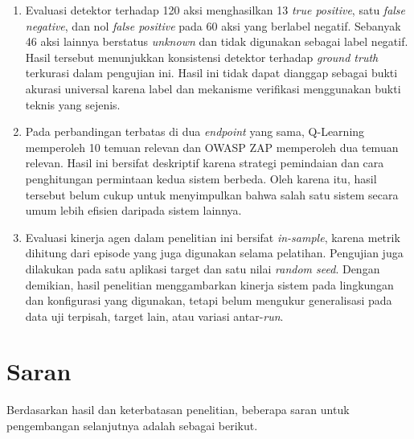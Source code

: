 \begin{enumerate}
    \item Evaluasi detektor terhadap 120 aksi menghasilkan 13 \textit{true positive}, satu \textit{false negative}, dan nol \textit{false positive} pada 60 aksi yang berlabel negatif. Sebanyak 46 aksi lainnya berstatus \textit{unknown} dan tidak digunakan sebagai label negatif. Hasil tersebut menunjukkan konsistensi detektor terhadap \textit{ground truth} terkurasi dalam pengujian ini. Hasil ini tidak dapat dianggap sebagai bukti akurasi universal karena label dan mekanisme verifikasi menggunakan bukti teknis yang sejenis.

    \item Pada perbandingan terbatas di dua \textit{endpoint} yang sama, Q-Learning memperoleh 10 temuan relevan dan OWASP ZAP memperoleh dua temuan relevan. Hasil ini bersifat deskriptif karena strategi pemindaian dan cara penghitungan permintaan kedua sistem berbeda. Oleh karena itu, hasil tersebut belum cukup untuk menyimpulkan bahwa salah satu sistem secara umum lebih efisien daripada sistem lainnya.

    \item Evaluasi kinerja agen dalam penelitian ini bersifat \textit{in-sample}, karena metrik dihitung dari episode yang juga digunakan selama pelatihan. Pengujian juga dilakukan pada satu aplikasi target dan satu nilai \textit{random seed}. Dengan demikian, hasil penelitian menggambarkan kinerja sistem pada lingkungan dan konfigurasi yang digunakan, tetapi belum mengukur generalisasi pada data uji terpisah, target lain, atau variasi antar-\textit{run}.
\end{enumerate}

\section{Saran}

Berdasarkan hasil dan keterbatasan penelitian, beberapa saran untuk pengembangan selanjutnya adalah sebagai berikut.

